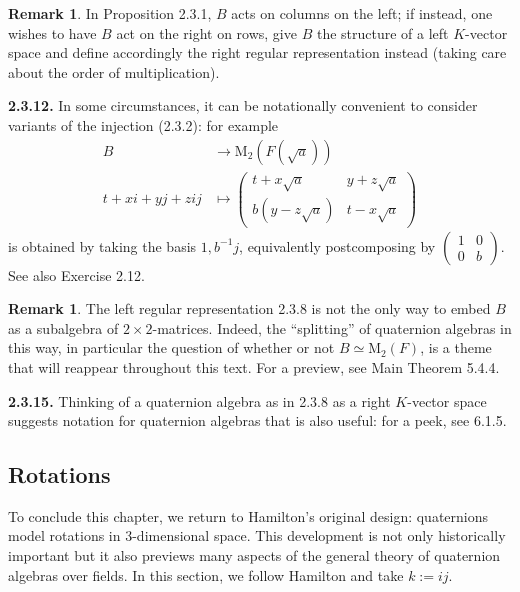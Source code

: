 \documentclass{article}
\theoremstyle{definition}
\newtheorem{remark}[theorem]{Remark}
\begin{document}
\begin{remark}
In Proposition 2.3.1, $B$ acts on columns on the left; if instead, one wishes to have $B$ act on the right on rows, give $B$ the structure of a left $K$-vector space and define accordingly the right regular representation instead (taking care about the order of multiplication).
\end{remark}

\textbf{2.3.12.} In some circumstances, it can be notationally convenient to consider variants of the injection (2.3.2): for example
\begin{equation}
\begin{aligned}
B &\rightarrow \mathrm{M}_2(F(\sqrt{a})) \\
t + xi + yj + zij &\mapsto \begin{pmatrix} t + x\sqrt{a} & y + z\sqrt{a} \\ b(y - z\sqrt{a}) & t - x\sqrt{a} \end{pmatrix}
\end{aligned} \tag{2.3.13}
\end{equation}
is obtained by taking the basis $1, b^{-1}j$, equivalently postcomposing by $\begin{pmatrix} 1 & 0 \\ 0 & b \end{pmatrix}$. See also Exercise 2.12.

\begin{remark}
The left regular representation 2.3.8 is not the only way to embed $B$ as a subalgebra of $2 \times 2$-matrices. Indeed, the ``splitting'' of quaternion algebras in this way, in particular the question of whether or not $B \simeq \mathrm{M}_2(F)$, is a theme that will reappear throughout this text. For a preview, see Main Theorem 5.4.4.
\end{remark}

\textbf{2.3.15.} Thinking of a quaternion algebra as in 2.3.8 as a right $K$-vector space suggests notation for quaternion algebras that is also useful: for a peek, see 6.1.5.

\subsection{Rotations}

To conclude this chapter, we return to Hamilton's original design: quaternions model rotations in 3-dimensional space. This development is not only historically important but it also previews many aspects of the general theory of quaternion algebras over fields. In this section, we follow Hamilton and take $k := ij$.
\end{document}
